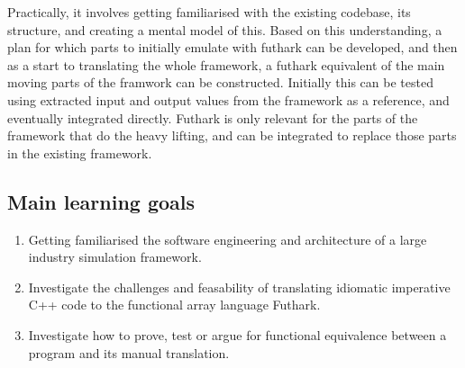 Practically, it involves getting familiarised with the existing codebase, its structure, and creating a mental model of this. Based on this understanding, a plan for which parts to initially emulate with futhark can be developed, and then as a start to translating the whole framework, a futhark equivalent of the main moving parts of the framwork can be constructed. Initially this can be tested using extracted input and output values from the framework as a reference, and eventually integrated directly. Futhark is only relevant for the parts of the framework that do the heavy lifting, and can be integrated to replace those parts in the existing framework.

\subsection*{Main learning goals}
\begin{enumerate}
\item Getting familiarised the software engineering and architecture of a large industry simulation framework.
\item Investigate the challenges and feasability of translating idiomatic imperative C++ code to the functional array language Futhark.
\item Investigate how to prove, test or argue for functional equivalence between a program and its manual translation.
\end{enumerate}

\printbibliography



